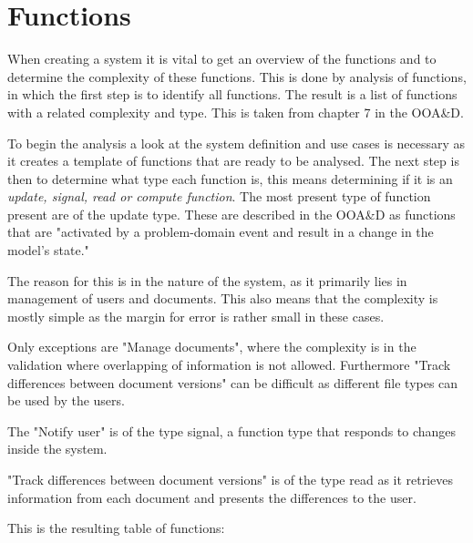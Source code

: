 \section{Functions}
When creating a system it is vital to get an overview of the functions and to determine the complexity of these functions. This is done by analysis of functions, in which the first step is to identify all functions. The result is a list of functions with a related complexity and type. This is taken from chapter 7 in the OOA\&D.\citep[ch.~7]{Rod-Aalborg}

To begin the analysis a look at the system definition and use cases is necessary as it creates a template of functions that are ready to be analysed. The next step is then to determine what type each function is, this means determining if it is an \textit{update, signal, read or compute function}. The most present type of function present are of the update type. These are described in the OOA\&D as functions that are "activated by a problem-domain event and result in a change in the model's state."\citep[p.~140]{Rod-Aalborg}

The reason for this is in the nature of the system, as it primarily lies in management of users and documents. This also means that the complexity is mostly simple as the margin for error is rather small in these cases. 

Only exceptions are "Manage documents", where the complexity is in the validation where overlapping of information is not allowed. Furthermore "Track differences between document versions" can be difficult as different file types can be used by the users.

The "Notify user" is of the type signal, a function type that responds to changes inside the system.

"Track differences between document versions" is of the type read as it retrieves information from each document and presents the differences to the user.

This is the resulting table of functions:

